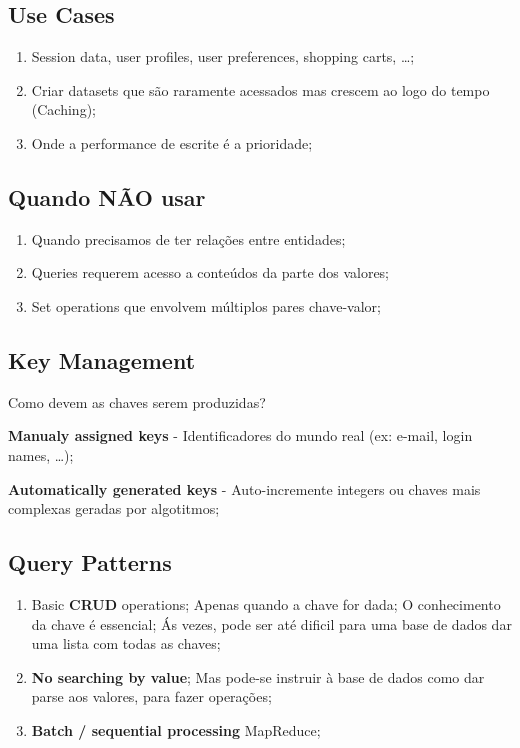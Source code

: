 \documentclass{article}
\begin{document}
\subsection{Use Cases}

\begin{enumerate}
  \item Session data, user profiles, user preferences, shopping
  carts, \dots;
  \item Criar datasets que são raramente acessados mas crescem ao logo do tempo (Caching);
  \item Onde a performance de escrite é a prioridade;
\end{enumerate}

\subsection{Quando NÃO usar}

\begin{enumerate}
  \item Quando precisamos de ter relações entre entidades;
  \item Queries requerem acesso a conteúdos da parte dos valores;
  \item Set operations que envolvem múltiplos pares chave-valor;
\end{enumerate}

\subsection{Key Management}

\begin{flushleft}
  Como devem as chaves serem produzidas?

  \item \textbf{Manualy assigned keys} - Identificadores do mundo real (ex: e-mail, login names, \dots);
  \item  \textbf{Automatically generated keys} - Auto-incremente integers ou chaves mais complexas geradas por algotitmos;
\end{flushleft}


\pagebreak

\subsection{Query Patterns}

\begin{enumerate}
  \item Basic \textbf{CRUD} operations;
  \subitem Apenas quando a chave for dada;
  \subitem O conhecimento da chave é essencial;
  \subitem Ás vezes, pode ser até dificil para uma base de dados dar uma lista com todas as chaves;

  \item \textbf{No searching by value};
  \subitem Mas pode-se instruir à base de dados como dar parse aos valores, para fazer operações;

  \item \textbf{Batch / sequential processing}
  \subitem MapReduce;
\end{enumerate}
\end{document}
